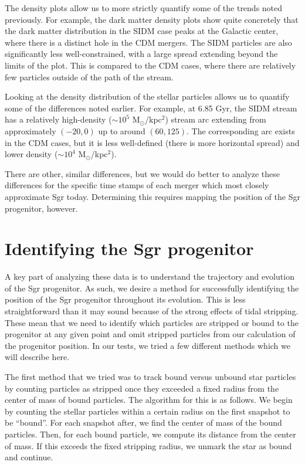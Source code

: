 The density plots allow us to more strictly quantify some of the trends noted
previously. For example, the dark matter density plots show quite concretely
that the dark matter distribution in the SIDM case peaks at the Galactic center,
where there is a distinct hole in the CDM mergers. The SIDM particles are also
significantly less well-constrained, with a large spread extending beyond the
limits of the plot. This is compared to the CDM cases, where there are
relatively few particles outside of the path of the stream.

Looking at the density distribution of the stellar particles allows us to
quantify some of the differences noted earlier.  For example, at 6.85 Gyr, the
SIDM stream has a relatively high-density ($\sim 10^5$ M$_\odot$/kpc$^2$)
stream arc extending from approximately $(-20,0)$ up to around $(60,125)$.
The corresponding arc exists in the CDM cases, but it is less well-defined
(there is more horizontal spread) and lower density ($\sim 10^4$
M$_\odot$/kpc$^2$).

There are other, similar differences, but we would do better to analyze these
differences for the specific time stamps of each merger which most closely
approximate Sgr today. Determining this requires mapping the position of the Sgr
progenitor, however.


\hypertarget{identifying-the-sgr-progenitor}{%
\section{Identifying the Sgr
progenitor}\label{identifying-the-sgr-progenitor}}

A key part of analyzing these data is to understand the trajectory and
evolution of the Sgr progenitor.  As such, we desire a method for successfully
identifying the position of the Sgr progenitor throughout its evolution.  This
is less straightforward than it may sound because of the strong effects of
tidal stripping.  These mean that we need to identify which particles are
stripped or bound to the progenitor at any given point and omit stripped
particles from our calculation of the progenitor position.  In our tests, we
tried a few different methods which we will describe here.

The first method that we tried was to track bound versus unbound star
particles by counting particles as stripped once they exceeded a fixed radius
from the center of mass of bound particles.  The algorithm for this is as
follows.  We begin by counting the stellar particles within a certain radius
on the first snapshot to be ``bound''.  For each snapshot after, we find the
center of mass of the bound particles.  Then, for each bound particle, we
compute its distance from the center of mass.  If this exceeds the fixed
stripping radius, we unmark the star as bound and continue.

